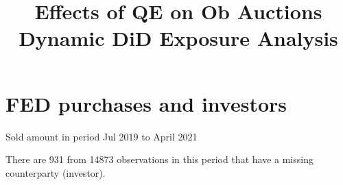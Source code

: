 \documentclass[11pt,a4paper]{article}
\begin{document}
\title{Effects of QE on Ob Auctions \\ Dynamic DiD Exposure Analysis}

\maketitle

\section{FED purchases and investors}

\begin{table}[h]
    \centering
    
    \caption{Sold amount in period Jul 2019 to April 2021}\label{tab:descriptive}
\end{table}

There are 931 from  14873 observations in this period that have a missing counterparty (investor).
\end{document}
